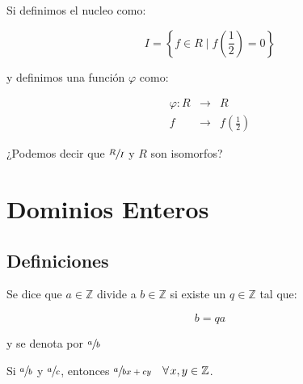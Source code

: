         \begin{ejercicio}
            Si definimos el nucleo como:

            \begin{equation*}
                I = \left\{ f \in R \mid f \left( \frac{1}{2} \right) = 0 \right\}
            \end{equation*}

            y definimos una función $\varphi$ como:

            \begin{eqnarray*}
                \varphi \colon R & \to & R \\
                f & \to & f \left( \frac{1}{2} \right)
            \end{eqnarray*}

            ¿Podemos decir que $\sfrac{R}{I}$ y $R$ son isomorfos?
        \end{ejercicio}


\newpage
\section{Dominios Enteros}


    \subsection{Definiciones}

        \begin{definicion}
            Se dice que $a \in \mathbb{Z}$ divide a $b \in \mathbb{Z}$ si existe un $q \in \mathbb{Z}$ tal que:

            \begin{equation}
                b = q a
            \end{equation}

            y se denota por $\sfrac{a}{b}$
        \end{definicion}

        \begin{teorema}
            Si $\sfrac{a}{b}$ y $\sfrac{a}{c}$, entonces $\sfrac{a}{bx + cy} \quad \forall \mkern2mu x, y \in \mathbb{Z}$.
        \end{teorema}

